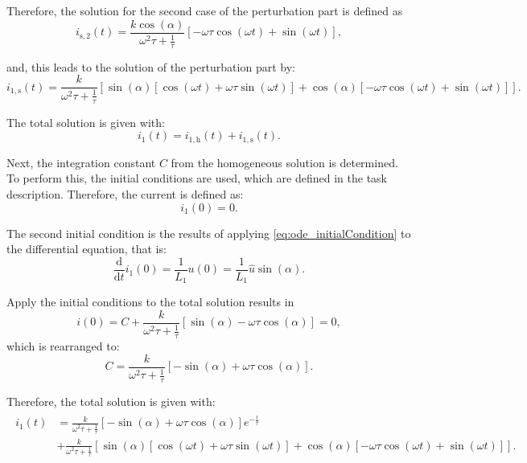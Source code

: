\begin{solutionblock}
  Therefore, the solution for the second case of the perturbation part is defined as
  \begin{equation}
    i_{\mathrm{s,2}}(t) = \frac{k\cos(\alpha)}{\omega^2 \tau + \frac{1}{\tau}} \left[-\omega \tau \cos(\omega t) + \sin(\omega t) \right],
    \end{equation}

 and, this leads to the solution of the perturbation part by:
  \begin{equation}
    i_{\mathrm{1,s}}(t) = \frac{k}{\omega^2 \tau + \frac{1}{\tau}}
    \left[
      \sin(\alpha)\left[\cos(\omega t) + \omega \tau \sin(\omega t) \right]
      + \cos(\alpha) \left[-\omega \tau \cos(\omega t) + \sin(\omega t) \right]
    \right].
  \end{equation}

  The total solution is given with:
  \begin{equation}
    i_{\mathrm{1}}(t) = i_{\mathrm{1,h}}(t) + i_{\mathrm{1,s}}(t).
  \end{equation}


  Next, the integration constant $C$ from the homogeneous solution is determined. To perform this, the initial conditions are used, which are defined in the task description. Therefore, the current is defined as:
  \begin{equation}
    i_{\mathrm{1}}(0) = 0.
    \label{eq:ode_initialCondition}
  \end{equation}
  
  The second initial condition is the results of applying \eqref{eq:ode_initialCondition} to the differential equation, that is:
  \begin{equation}
    \frac{\mathrm{d}}{\mathrm{d}t}i_{\mathrm{1}}(0) = \frac{1}{L_{\mathrm{1}}}u(0) = \frac{1}{L_{\mathrm{1}}} \hat{u}\sin(\alpha).
  \end{equation}

  Apply the initial conditions to the total solution results in
  \begin{equation}
    i(0) = C + \frac{k}{\omega^2 \tau + \frac{1}{\tau}}
    \left[\sin(\alpha) - \omega \tau \cos(\alpha) \right] = 0,
  \end{equation}
  which is rearranged to:
  \begin{equation}
    C = \frac{k}{\omega^2\tau + \frac{1}{\tau}} \left[-\sin(\alpha) + \omega \tau \cos(\alpha) \right].
  \end{equation}

  Therefore, the total solution is given with:
  \begin{align}
    \begin{split}
      i_{\mathrm{1}}(t) &=\frac{k}{\omega^2\tau + \frac{1}{\tau}} \left[-\sin(\alpha) + \omega \tau \cos(\alpha) \right] e^{-\frac{t}{\tau}} \\
      &+\frac{k}{\omega^2 \tau + \frac{1}{\tau}}
      \left[
        \sin(\alpha)\left[\cos(\omega t) + \omega \tau \sin(\omega t) \right]
        + \cos(\alpha) \left[-\omega \tau \cos(\omega t) + \sin(\omega t) \right]
      \right].
      \label{eq:ode_solution}
  \end{split}
  \end{align}


\end{solutionblock}

